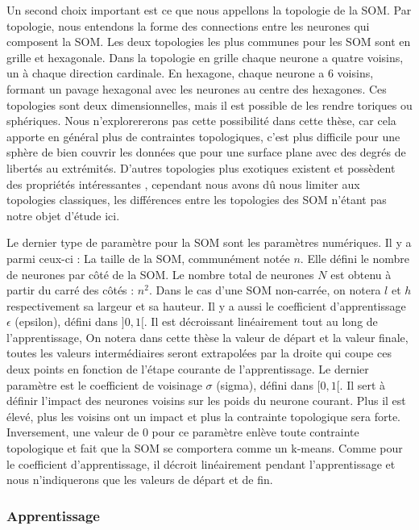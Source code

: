 	Un second choix important est ce que nous appellons la topologie de la SOM. Par topologie, nous entendons la forme des connections entre les neurones qui composent la SOM. Les deux topologies les plus communes pour les SOM sont en grille et hexagonale. Dans la topologie en grille chaque neurone a quatre voisins, un à chaque direction cardinale. En hexagone, chaque neurone a 6 voisins, formant un pavage hexagonal avec les neurones au centre des hexagones. Ces topologies sont deux dimensionnelles, mais il est possible de les rendre toriques ou sphériques. Nous n'explorererons pas cette possibilité dans cette thèse, car cela apporte en général plus de contraintes topologiques, c'est plus difficile pour une sphère de bien couvrir les données que pour une surface plane avec des degrés de libertés au extrémités. D'autres topologies plus exotiques existent et possèdent des propriétés intéressantes \cite{bernard2018np}, cependant nous avons dû nous limiter aux topologies classiques, les différences entre les topologies des SOM n'étant pas notre objet d'étude ici.

	Le dernier type de paramètre pour la SOM sont les paramètres numériques. Il y a parmi ceux-ci : La taille de la SOM, communément notée $n$. Elle défini le nombre de neurones par côté de la SOM. Le nombre total de neurones $N$ est obtenu à partir du carré des côtés : $n^2$. Dans le cas d'une SOM non-carrée, on notera $l$ et $h$ respectivement sa largeur et sa hauteur. Il y a aussi le coefficient d'apprentissage $\epsilon$ (epsilon), défini dans $]0,1[$. Il est décroissant linéairement tout au long de l'apprentissage, On notera dans cette thèse la valeur de départ et la valeur finale, toutes les valeurs intermédiaires seront extrapolées par la droite qui coupe ces deux points en fonction de l'étape courante de l'apprentissage. Le dernier paramètre est le coefficient de voisinage $\sigma$ (sigma), défini dans $[0,1[$. Il sert à définir l'impact des neurones voisins sur les poids du neurone courant. Plus il est élevé, plus les voisins ont un impact et plus la contrainte topologique sera forte. Inversement, une valeur de 0 pour ce paramètre enlève toute contrainte topologique et fait que la SOM se comportera comme un k-means. Comme pour le coefficient d'apprentissage, il décroit linéairement pendant l'apprentissage et nous n'indiquerons que les valeurs de départ et de fin.

\subsubsection{Apprentissage}

